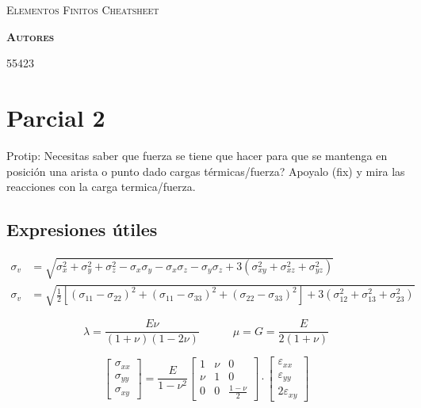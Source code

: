 \documentclass[11pt, a4paper,titlepage]{article}
\newcommand{\feaPP}{null.tex}
\begin{document}
\begin{titlepage} %
\centering
{\scshape\Huge Elementos Finitos Cheatsheet \par}
\vspace{1cm}

\vspace{2cm}
{\scshape\Large\textbf{Autores} \par}
\medskip %
 \textsc{55423}

\end{titlepage} %




\section{Parcial 2}
Protip: Necesitas saber que fuerza se tiene que hacer para que se mantenga en posición una arista o punto dado cargas térmicas/fuerza? Apoyalo (fix) y mira las reacciones con la carga termica/fuerza.
\subsection{Expresiones útiles}

\begin{align}
    \sigma_{v}&=\sqrt{\sigma_{x}^2+\sigma_{y}^2+\sigma_{z}^2 - \sigma_x \sigma_y-\sigma_x\sigma_z -\sigma_y \sigma_z +3(\sigma_{xy}^2+\sigma_{xz}^2 +\sigma_{yz}^2)} \\
    \sigma_{v}&=\sqrt{\tfrac{1}{2}\left[  (\sigma_{11}-\sigma_{22})^2+(\sigma_{11}-\sigma_{33})^2+(\sigma_{22}-\sigma_{33})^2\right] +3(\sigma_{12}^2+\sigma_{13}^2 +\sigma_{23}^2)}
\end{align}

\begin{equation}
    \lambda = \frac{E \nu}{(1+\nu)(1-2\nu)} \qquad\quad \mu=G=\frac{E}{2(1+\nu)}
\end{equation}

\begin{equation}
\begin{bmatrix}
    \sigma_{xx} \\
    \sigma_{yy} \\
    \sigma_{xy}
\end{bmatrix}
={\frac{E}{1-\nu^2}} 
\begin{bmatrix}
    1 & \nu & 0 \\
    \nu & 1 &0 \\
    0 & 0 & \frac{1-\nu}{2}
\end{bmatrix}
\cdot
\begin{bmatrix}
    \varepsilon_{xx} \\
    \varepsilon_{yy} \\
    2\varepsilon_{xy}
\end{bmatrix}
\end{equation}
\end{document}
